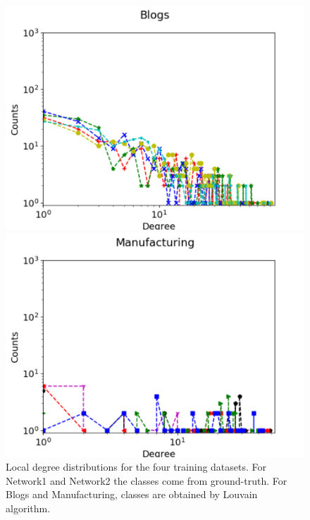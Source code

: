 \begin{figure}[h]
\begin{minipage}{0.4\textwidth}
            \includegraphics[width=\textwidth]{img/corpus/blogs_1}
        \end{minipage}
        \begin{minipage}{0.4\textwidth}
            \includegraphics[width=\textwidth]{img/corpus/manufacturing_1}
        \end{minipage}
        \caption {Local degree distributions for the four training datasets. For Network1 and Network2 the classes come from ground-truth. For Blogs and Manufacturing, classes are obtained by Louvain algorithm.} 
	\label{fig:synt_graph_local}
\end{figure}


